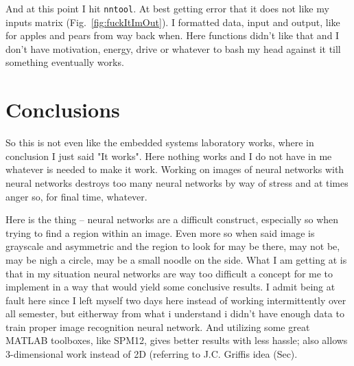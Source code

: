 \documentclass[12pt]{article}
\begin{document}

And at this point I hit \texttt{nntool}. At best getting error that it does not like my inputs matrix (Fig.~\ref{fig:fuckItImOut}). I formatted data, input and output, like for apples and pears from way back when. Here functions didn't like that and I don't have motivation, energy, drive or whatever to bash my head against it till something eventually works.

\section{Conclusions}
\label{sec:conclusions}

So this is not even like the embedded systems laboratory works, where in conclusion I just said "It works". Here nothing works and I do not have in me whatever is needed to make it work. Working on images of neural networks with neural networks destroys too many neural networks by way of stress and at times anger so, for final time, whatever.

Here is the thing – neural networks are a difficult construct, especially so when trying to find a region within an image. Even more so when said image is grayscale and asymmetric and the region to look for may be there, may not be, may be nigh a circle, may be a small noodle on the side. What I am getting at is that in my situation neural networks are way too difficult a concept for me to implement in a way that would yield some conclusive results. I admit being at fault here since I left myself two days here instead of working intermittently over all semester, but eitherway from what i understand i didn't have enough data to train proper image recognition neural network. And utilizing some great MATLAB toolboxes, like SPM12, gives better results with less hassle; also allows 3-dimensional work instead of 2D (referring to J.C. Griffis idea \cite{griffis2016voxel}(Sec).
\end{document}
